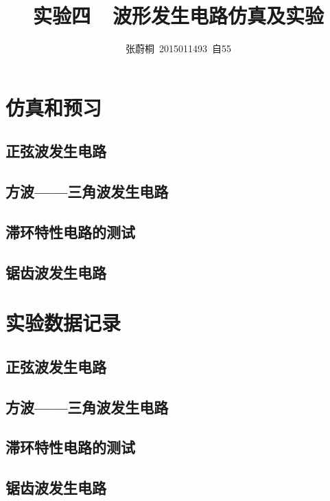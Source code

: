\documentclass[UTF8,a4paper]{paper}
\title{实验四\ \ 波形发生电路仿真及实验}
\author{张蔚桐\ 2015011493\ 自55}
\begin{document}
\maketitle
\section{仿真和预习}
\subsection{正弦波发生电路}
\subsection{方波——三角波发生电路}
\subsection{滞环特性电路的测试}
\subsection{锯齿波发生电路}
\section{实验数据记录}
\subsection{正弦波发生电路}
\subsection{方波——三角波发生电路}
\subsection{滞环特性电路的测试}
\subsection{锯齿波发生电路}
\end{document}
